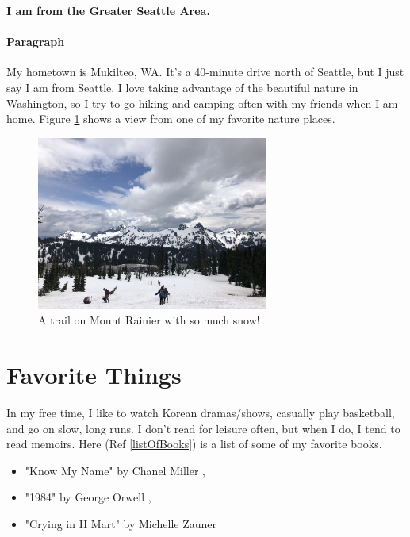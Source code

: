 \documentclass{article}
\begin{document}
  \noindent \textbf{I am from the Greater Seattle Area.}

    \paragraph{Paragraph}
    My hometown is Mukilteo, WA. It's a 40-minute drive north of Seattle, but I just say I am from Seattle. I love taking advantage of the beautiful nature in Washington, 
    so I try to go hiking and camping often with my friends when I am home. Figure \ref{fig:mountain} shows a view from one of my favorite nature places. 

    \begin{figure}[hbt!]
      \begin{center}
      \includegraphics[width=3in]{mtRainier-1.jpg}
      \captionsetup{justification=centering}
      \caption{A trail on Mount Rainier with so much snow!}
      \label{fig:mountain}
      \end{center}
    \end{figure} 


  \section{Favorite Things}
  In my free time, I like to watch Korean dramas/shows, casually play basketball, and go on slow, long runs. 
  I don't read for leisure often, but when I do, I tend to read memoirs. Here (Ref \ref*{listOfBooks}) is a list of some of my favorite books. 

    \begin{itemize}
      \label{listOfBooks}
      \item "Know My Name" by Chanel Miller \cite{BOOK:1},
      \item  "1984" by George Orwell \cite{BOOK:2},
      \item "Crying in H Mart" by Michelle Zauner \cite{BOOK:3}
    \end{itemize}
\end{document}
